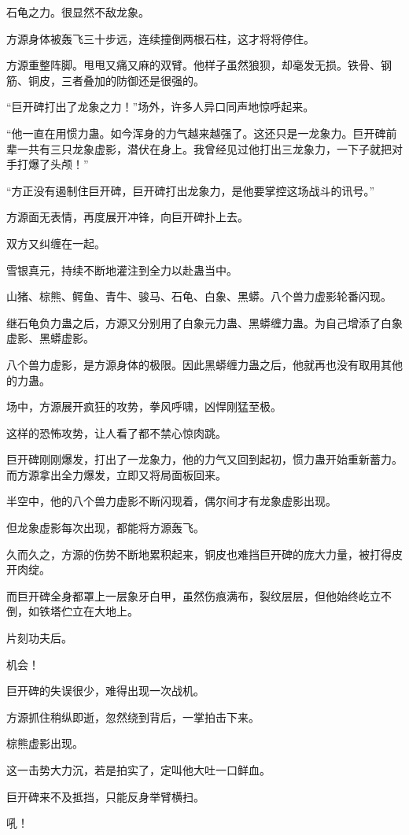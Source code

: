 \begin{this_body}
石龟之力。很显然不敌龙象。

方源身体被轰飞三十步远，连续撞倒两根石柱，这才将将停住。

方源重整阵脚。甩甩又痛又麻的双臂。他样子虽然狼狈，却毫发无损。铁骨、钢筋、铜皮，三者叠加的防御还是很强的。

“巨开碑打出了龙象之力！”场外，许多人异口同声地惊呼起来。

“他一直在用惯力蛊。如今浑身的力气越来越强了。这还只是一龙象力。巨开碑前辈一共有三只龙象虚影，潜伏在身上。我曾经见过他打出三龙象力，一下子就把对手打爆了头颅！”

“方正没有遏制住巨开碑，巨开碑打出龙象力，是他要掌控这场战斗的讯号。”

方源面无表情，再度展开冲锋，向巨开碑扑上去。

双方又纠缠在一起。

雪银真元，持续不断地灌注到全力以赴蛊当中。

山猪、棕熊、鳄鱼、青牛、骏马、石龟、白象、黑蟒。八个兽力虚影轮番闪现。

继石龟负力蛊之后，方源又分别用了白象元力蛊、黑蟒缠力蛊。为自己增添了白象虚影、黑蟒虚影。

八个兽力虚影，是方源身体的极限。因此黑蟒缠力蛊之后，他就再也没有取用其他的力蛊。

场中，方源展开疯狂的攻势，拳风呼啸，凶悍刚猛至极。

这样的恐怖攻势，让人看了都不禁心惊肉跳。

巨开碑刚刚爆发，打出了一龙象力，他的力气又回到起初，惯力蛊开始重新蓄力。而方源拿出全力爆发，立即又将局面板回来。

半空中，他的八个兽力虚影不断闪现着，偶尔间才有龙象虚影出现。

但龙象虚影每次出现，都能将方源轰飞。

久而久之，方源的伤势不断地累积起来，铜皮也难挡巨开碑的庞大力量，被打得皮开肉绽。

而巨开碑全身都罩上一层象牙白甲，虽然伤痕满布，裂纹层层，但他始终屹立不倒，如铁塔伫立在大地上。

片刻功夫后。

机会！

巨开碑的失误很少，难得出现一次战机。

方源抓住稍纵即逝，忽然绕到背后，一掌拍击下来。

棕熊虚影出现。

这一击势大力沉，若是拍实了，定叫他大吐一口鲜血。

巨开碑来不及抵挡，只能反身举臂横扫。

吼！


\end{this_body}
